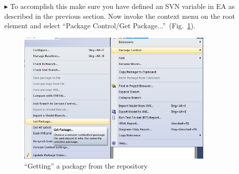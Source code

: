 \begin{enumerate}
\item[$\blacktriangleright$] To accomplish this make sure you have defined an SVN variable in EA as described in the previous section. 
Now invoke the context menu on the root element and select ``Package Control/Get Package...''~(Fig.~\ref{fig:advanced-topics-eaSVN-getpackage}).
\begin{figure}[!ht]
\begin{center}
	\includegraphics[width=0.9\textwidth]{pics/advancedTopics/eaSVN/DemoLanguages/004.png}
	\caption{``Getting'' a package from the repository}
  	\label{fig:advanced-topics-eaSVN-getpackage}
\end{center}
\end{figure}


\end{enumerate}
